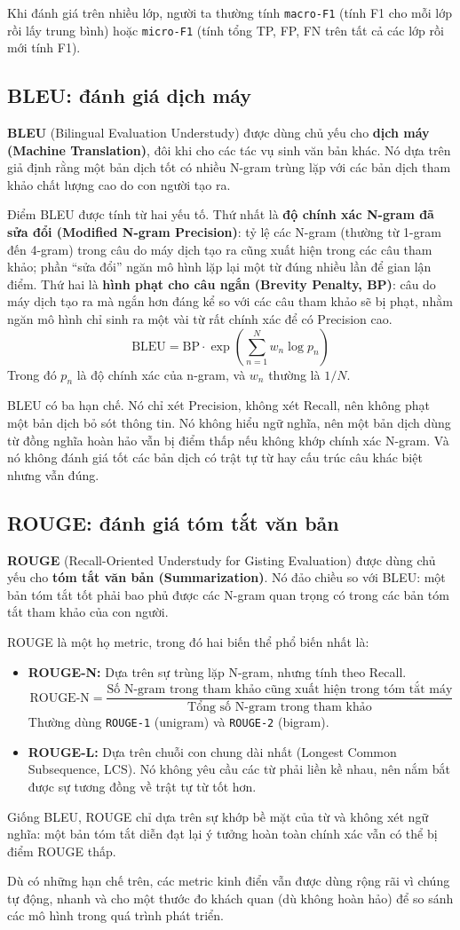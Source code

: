 Khi đánh giá trên nhiều lớp, người ta thường tính \texttt{macro-F1} (tính F1 cho mỗi lớp rồi lấy trung bình) hoặc \texttt{micro-F1} (tính tổng TP, FP, FN trên tất cả các lớp rồi mới tính F1).

\subsection{BLEU: đánh giá dịch máy}
\label{ssec:bleu}
\textbf{BLEU} (Bilingual Evaluation Understudy) được dùng chủ yếu cho \textbf{dịch máy (Machine Translation)}, đôi khi cho các tác vụ sinh văn bản khác. Nó dựa trên giả định rằng một bản dịch tốt có nhiều N-gram trùng lặp với các bản dịch tham khảo chất lượng cao do con người tạo ra.

Điểm BLEU được tính từ hai yếu tố. Thứ nhất là \textbf{độ chính xác N-gram đã sửa đổi (Modified N-gram Precision)}: tỷ lệ các N-gram (thường từ 1-gram đến 4-gram) trong câu do máy dịch tạo ra cũng xuất hiện trong các câu tham khảo; phần “sửa đổi” ngăn mô hình lặp lại một từ đúng nhiều lần để gian lận điểm. Thứ hai là \textbf{hình phạt cho câu ngắn (Brevity Penalty, BP)}: câu do máy dịch tạo ra mà ngắn hơn đáng kể so với các câu tham khảo sẽ bị phạt, nhằm ngăn mô hình chỉ sinh ra một vài từ rất chính xác để có Precision cao.
$$ \text{BLEU} = \text{BP} \cdot \exp\left(\sum_{n=1}^{N} w_n \log p_n\right) $$
Trong đó $p_n$ là độ chính xác của n-gram, và $w_n$ thường là $1/N$.

BLEU có ba hạn chế. Nó chỉ xét Precision, không xét Recall, nên không phạt một bản dịch bỏ sót thông tin. Nó không hiểu ngữ nghĩa, nên một bản dịch dùng từ đồng nghĩa hoàn hảo vẫn bị điểm thấp nếu không khớp chính xác N-gram. Và nó không đánh giá tốt các bản dịch có trật tự từ hay cấu trúc câu khác biệt nhưng vẫn đúng.

\subsection{ROUGE: đánh giá tóm tắt văn bản}
\label{ssec:rouge}
\textbf{ROUGE} (Recall-Oriented Understudy for Gisting Evaluation) được dùng chủ yếu cho \textbf{tóm tắt văn bản (Summarization)}. Nó đảo chiều so với BLEU: một bản tóm tắt tốt phải bao phủ được các N-gram quan trọng có trong các bản tóm tắt tham khảo của con người.

ROUGE là một họ metric, trong đó hai biến thể phổ biến nhất là:
\begin{itemize}
    \item \textbf{ROUGE-N:} Dựa trên sự trùng lặp N-gram, nhưng tính theo Recall.
        $$ \text{ROUGE-N} = \frac{\text{Số N-gram trong tham khảo cũng xuất hiện trong tóm tắt máy}}{\text{Tổng số N-gram trong tham khảo}} $$
        Thường dùng \texttt{ROUGE-1} (unigram) và \texttt{ROUGE-2} (bigram).
    \item \textbf{ROUGE-L:} Dựa trên chuỗi con chung dài nhất (Longest Common Subsequence, LCS). Nó không yêu cầu các từ phải liền kề nhau, nên nắm bắt được sự tương đồng về trật tự từ tốt hơn.
\end{itemize}
Giống BLEU, ROUGE chỉ dựa trên sự khớp bề mặt của từ và không xét ngữ nghĩa: một bản tóm tắt diễn đạt lại ý tưởng hoàn toàn chính xác vẫn có thể bị điểm ROUGE thấp.

Dù có những hạn chế trên, các metric kinh điển vẫn được dùng rộng rãi vì chúng tự động, nhanh và cho một thước đo khách quan (dù không hoàn hảo) để so sánh các mô hình trong quá trình phát triển.